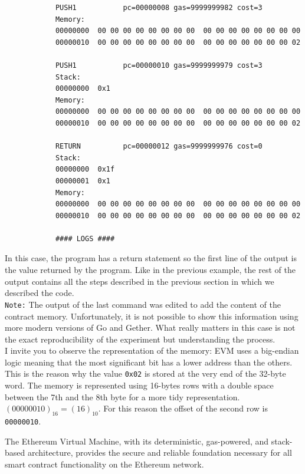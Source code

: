 \documentclass{scrbook}
\begin{document}
\begin{enumerate}
\begin{lstlisting}
            PUSH1           pc=00000008 gas=9999999982 cost=3
            Memory:
            00000000  00 00 00 00 00 00 00 00  00 00 00 00 00 00 00 00
            00000010  00 00 00 00 00 00 00 00  00 00 00 00 00 00 00 02
            
            PUSH1           pc=00000010 gas=9999999979 cost=3
            Stack:
            00000000  0x1
            Memory:
            00000000  00 00 00 00 00 00 00 00  00 00 00 00 00 00 00 00
            00000010  00 00 00 00 00 00 00 00  00 00 00 00 00 00 00 02
            
            RETURN          pc=00000012 gas=9999999976 cost=0
            Stack:
            00000000  0x1f
            00000001  0x1
            Memory:
            00000000  00 00 00 00 00 00 00 00  00 00 00 00 00 00 00 00
            00000010  00 00 00 00 00 00 00 00  00 00 00 00 00 00 00 02
            
            #### LOGS ####
        \end{lstlisting}
        In this case, the program has a return statement so the first line of the output is the value returned by the program. Like in the previous example, the rest of the output contains all the steps described in the previous section in which we described the code.\\

        \noindent
        \texttt{Note:} The output of the last command was edited to add the content of the contract memory. Unfortunately, it is not possible to show this information using more modern versions of Go and Gether. What really matters in this case is not the exact reproducibility of the experiment but understanding the process.\\

        I invite you to observe the representation of the memory: EVM uses a big-endian logic meaning that the most significant bit has a lower address than the others. This is the reason why the value \texttt{0x02} is stored at the very end of the 32-byte word. The memory is represented using 16-bytes rows with a double space between the 7th and the 8th byte for a more tidy representation. $(00000010)_{16}=(16)_{10}$. For this reason the offset of the second row is \texttt{00000010}.
\end{enumerate}

The Ethereum Virtual Machine, with its deterministic, gas-powered, and stack-based architecture, provides the secure and reliable foundation necessary for all smart contract functionality on the Ethereum network.
\end{document}
